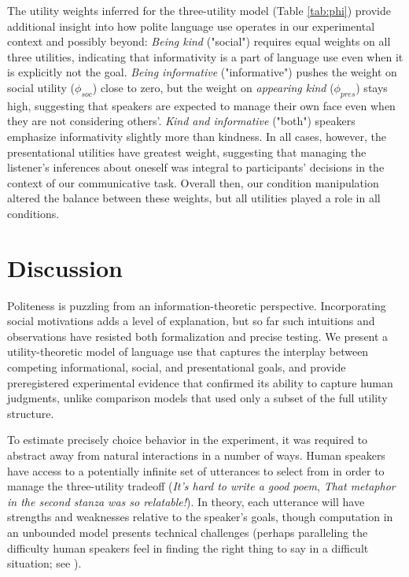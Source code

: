 \documentclass[9pt,twocolumn,twoside,lineno]{main_class_file}
\begin{document}
The utility weights inferred for the three-utility model (Table \ref{tab:phi})
provide additional insight into how polite language use operates in our experimental context and possibly beyond:
\emph{Being kind} ("social") requires equal weights on all three utilities,
indicating that informativity is a part of language use
even when it is explicitly not the goal.
\emph{Being informative} ("informative") pushes
the weight on social utility ($\phi_{soc}$) close to zero, but the weight on 
\emph{appearing kind} ($\phi_{pres}$) stays high, suggesting that speakers are expected
to manage their own face even when they are not considering others'.
\emph{Kind and informative} ("both") speakers emphasize informativity slightly
more than kindness. 
In all cases, however, the presentational utilities have greatest weight, 
suggesting that managing the listener's inferences about oneself was integral to participants' decisions in the context of our  communicative task.
Overall then, our condition manipulation altered the balance between these weights, 
but all utilities played a role in all conditions.

\section*{Discussion}

Politeness is puzzling from an information-theoretic perspective.
Incorporating social motivations adds a level of explanation, but so far such intuitions and observations have resisted both formalization and precise testing.
We present a utility-theoretic model of language use that captures the interplay between competing
informational, social, and presentational goals, and provide preregistered
experimental evidence that confirmed its ability to capture human
judgments, unlike comparison models that used only a subset of the full
utility structure.

To estimate precisely choice behavior in the experiment,
it was required to abstract away
from natural interactions in a number of ways.
Human speakers have access
to a potentially infinite set of utterances to select from in order to manage the three-utility tradeoff (\emph{It's hard to write a good poem}, \emph{That
metaphor in the second stanza was so relatable!}). In theory,
each utterance will have strengths and weaknesses relative to the
speaker's goals, though computation in an unbounded model presents
technical challenges (perhaps paralleling the difficulty human speakers
feel in finding the right thing to say in a difficult situation; see \cite{goodman2016}).
\end{document}
